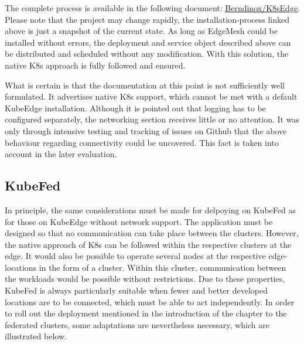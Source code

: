 \documentclass[MSC,Master,english]{twbook}%
\begin{document}
The complete process is available in the following document: \hyperref{https://github.com/Berndinox/K8sEdge/blob/main/DOCs/kubeedge-edgemesh.md}{}{}{Berndinox/K8sEdge}. Please note that the project may change rapidly, the installation-process linked above is just a snapshot of the current state.  As long as EdgeMesh could be installed without errors, the deployment and service object described above can be distributed and scheduled without any modification. With this solution, the native \ac{K8s} approach is fully followed and ensured.\medbreak

What is certain is that the documentation at this point is not sufficiently well formulated. It advertises native \ac{K8s} support, which cannot be met with a default KubeEdge installation. Although it is pointed out that logging has to be configured separately, the networking section receives little or no attention. It was only through intensive testing and tracking of issues on Github that the above behaviour regarding connectivity could be uncovered. This fact is taken into account in the later evaluation.

\subsection{KubeFed} In principle, the same considerations must be made for delpoying on KubeFed as for those on KubeEdge without network support. The application must be designed so that no communication can take place between the clusters. However, the native approach of \ac{K8s} can be followed within the respective clusters at the edge. It would also be possible to operate several nodes at the respective edge-locations in the form of a cluster. Within this cluster, communication between the workloads would be possible without restrictions. Due to these properties, KubeFed is always particularly suitable when fewer and better developed locations are to be connected, which must be able to act independently. In order to roll out the deployment mentioned in the introduction of the chapter to the federated clusters, some adaptations are nevertheless necessary, which are illustrated below. 
\end{document}
